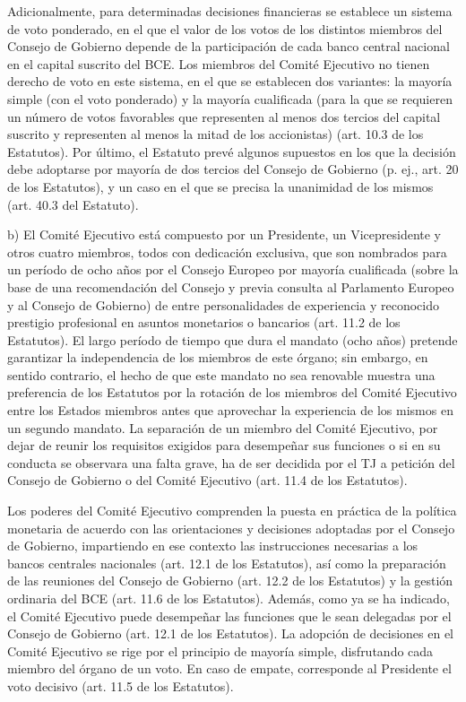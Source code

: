 \documentclass[10pt,a4paper]{article}
\begin{document}
Adicionalmente, para determinadas decisiones financieras se establece un sistema de voto ponderado, en el que el valor de los votos de los distintos miembros del Consejo de Gobierno depende de la participación de cada banco central nacional en el capital suscrito del BCE. Los miembros del Comité Ejecutivo no tienen derecho de voto en este sistema, en el que se establecen dos variantes: la mayoría simple (con el voto ponderado) y la mayoría cualificada (para la que se requieren un número de votos favorables que representen al menos dos tercios del capital suscrito y representen al menos la mitad de los accionistas) (art. 10.3 de los Estatutos). Por último, el Estatuto prevé algunos supuestos en los que la decisión debe adoptarse por mayoría de dos tercios del Consejo de Gobierno (p. ej., art. 20 de los Estatutos), y un caso en el que se precisa la unanimidad de los mismos (art. 40.3 del Estatuto).

b) El Comité Ejecutivo está compuesto por un Presidente, un Vicepresidente y otros cuatro miembros, todos con dedicación exclusiva, que son nombrados para un período de ocho años por el Consejo Europeo por mayoría cualificada (sobre la base de una recomendación del Consejo y previa consulta al Parlamento Europeo y al Consejo de Gobierno) de entre personalidades de experiencia y reconocido prestigio profesional en asuntos monetarios o bancarios (art. 11.2 de los Estatutos). El largo período de tiempo que dura el mandato (ocho años) pretende garantizar la independencia de los miembros de este órgano; sin embargo, en sentido contrario, el hecho de que este mandato no sea renovable muestra una preferencia de los Estatutos por la rotación de los miembros del Comité Ejecutivo entre los Estados miembros antes que aprovechar la experiencia de los mismos en un segundo mandato. La separación de un miembro del Comité Ejecutivo, por dejar de reunir los requisitos exigidos para desempeñar sus funciones o si en su conducta se observara una falta grave, ha de ser decidida por el TJ a petición del Consejo de Gobierno o del Comité Ejecutivo (art. 11.4 de los Estatutos).

Los poderes del Comité Ejecutivo comprenden la puesta en práctica de la política monetaria de acuerdo con las orientaciones y decisiones adoptadas por el Consejo de Gobierno, impartiendo en ese contexto las instrucciones necesarias a los bancos centrales nacionales (art. 12.1 de los Estatutos), así como la preparación de las reuniones del Consejo de Gobierno (art. 12.2 de los Estatutos) y la gestión ordinaria del BCE (art. 11.6 de los Estatutos). Además, como ya se ha indicado, el Comité Ejecutivo puede desempeñar las funciones que le sean delegadas por el Consejo de Gobierno (art. 12.1 de los Estatutos). La adopción de decisiones en el Comité Ejecutivo se rige por el principio de mayoría simple, disfrutando cada miembro del órgano de un voto. En caso de empate, corresponde al Presidente el voto decisivo (art. 11.5 de los Estatutos).
\end{document}
